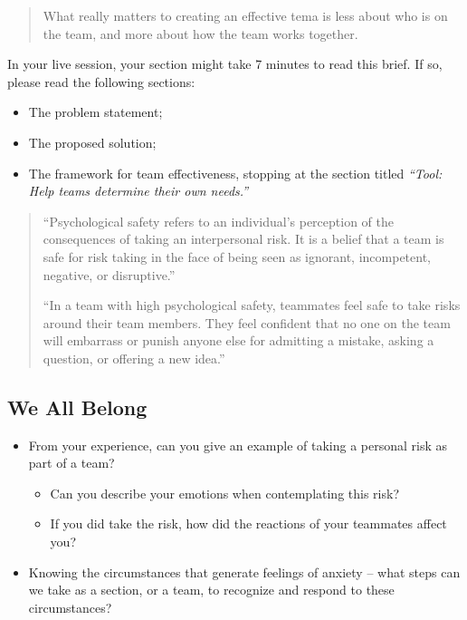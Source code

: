 \documentclass[
]{book}
\providecommand{\tightlist}{%
  \setlength{\itemsep}{0pt}\setlength{\parskip}{0pt}}
\theoremstyle{definition}
\theoremstyle{definition}
\theoremstyle{definition}
\theoremstyle{definition}
\theoremstyle{remark}
\begin{document}
\begin{quote}
What really matters to creating an effective tema is less about who is on the team, and more about how the team works together.
\end{quote}

In your live session, your section might take 7 minutes to read this brief. If so, please read the following sections:

\begin{itemize}
\tightlist
\item
  The problem statement;
\item
  The proposed solution;
\item
  The framework for team effectiveness, stopping at the section titled \emph{``Tool: Help teams determine their own needs.''}
\end{itemize}

\begin{quote}
``Psychological safety refers to an individual's perception of the consequences of taking an interpersonal risk. It is a belief that a team is safe for risk taking in the face of being seen as ignorant, incompetent, negative, or disruptive.''

``In a team with high psychological safety, teammates feel safe to take risks around their team members. They feel confident that no one on the team will embarrass or punish anyone else for admitting a mistake, asking a question, or offering a new idea.''
\end{quote}

\hypertarget{we-all-belong}{%
\subsection{We All Belong}\label{we-all-belong}}

\begin{itemize}
\tightlist
\item
  From your experience, can you give an example of taking a personal risk as part of a team?

  \begin{itemize}
  \tightlist
  \item
    Can you describe your emotions when contemplating this risk?
  \item
    If you did take the risk, how did the reactions of your teammates affect you?
  \end{itemize}
\item
  Knowing the circumstances that generate feelings of anxiety -- what steps can we take as a section, or a team, to recognize and respond to these circumstances?
\end{itemize}
\end{document}
